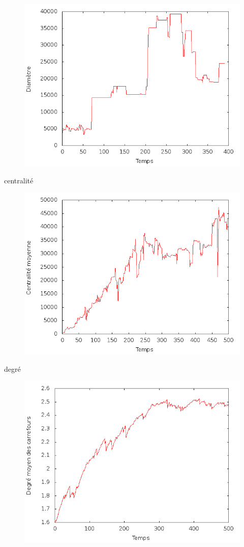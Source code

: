 \documentclass[12pt]{article}
\begin{document}
\begin{figure}[H]
  \centering
  \includegraphics[width=.8\linewidth]{images/diameter.png}
  \caption{}
\end{figure}

centralité

\begin{figure}[H]
  \centering
  \includegraphics[width=.8\linewidth]{images/centrality.png}
  \caption{}
\end{figure}

degré

\begin{figure}[H]
  \centering
  \includegraphics[width=.8\linewidth]{images/degree.png}
  \caption{}
\end{figure}
\end{document}
